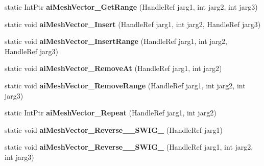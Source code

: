 \begin{DoxyCompactItemize}
\item 
\hypertarget{class_assimp_p_i_n_v_o_k_e_a067402d33404e75b24a23ec0c589fda9}{static Int\+Ptr {\bfseries ai\+Mesh\+Vector\+\_\+\+Get\+Range} (Handle\+Ref jarg1, int jarg2, int jarg3)}\label{class_assimp_p_i_n_v_o_k_e_a067402d33404e75b24a23ec0c589fda9}

\item 
\hypertarget{class_assimp_p_i_n_v_o_k_e_aa77d6f7cc1f1ae49b1a72f129b6dea1b}{static void {\bfseries ai\+Mesh\+Vector\+\_\+\+Insert} (Handle\+Ref jarg1, int jarg2, Handle\+Ref jarg3)}\label{class_assimp_p_i_n_v_o_k_e_aa77d6f7cc1f1ae49b1a72f129b6dea1b}

\item 
\hypertarget{class_assimp_p_i_n_v_o_k_e_a1399277a9d57d410a196fa8dad64eba4}{static void {\bfseries ai\+Mesh\+Vector\+\_\+\+Insert\+Range} (Handle\+Ref jarg1, int jarg2, Handle\+Ref jarg3)}\label{class_assimp_p_i_n_v_o_k_e_a1399277a9d57d410a196fa8dad64eba4}

\item 
\hypertarget{class_assimp_p_i_n_v_o_k_e_a43d3c23ec93759e18b2d0920986567df}{static void {\bfseries ai\+Mesh\+Vector\+\_\+\+Remove\+At} (Handle\+Ref jarg1, int jarg2)}\label{class_assimp_p_i_n_v_o_k_e_a43d3c23ec93759e18b2d0920986567df}

\item 
\hypertarget{class_assimp_p_i_n_v_o_k_e_a8bce49a751904101e55d2cc1dfda04bd}{static void {\bfseries ai\+Mesh\+Vector\+\_\+\+Remove\+Range} (Handle\+Ref jarg1, int jarg2, int jarg3)}\label{class_assimp_p_i_n_v_o_k_e_a8bce49a751904101e55d2cc1dfda04bd}

\item 
\hypertarget{class_assimp_p_i_n_v_o_k_e_a2faa3310281e171e500c1bdd4c5cc404}{static Int\+Ptr {\bfseries ai\+Mesh\+Vector\+\_\+\+Repeat} (Handle\+Ref jarg1, int jarg2)}\label{class_assimp_p_i_n_v_o_k_e_a2faa3310281e171e500c1bdd4c5cc404}

\item 
\hypertarget{class_assimp_p_i_n_v_o_k_e_ae2b9bc7da7ac8d34ffcad890d8e6fbb9}{static void {\bfseries ai\+Mesh\+Vector\+\_\+\+Reverse\+\_\+\+\_\+\+S\+W\+I\+G\+\_} (Handle\+Ref jarg1)}\label{class_assimp_p_i_n_v_o_k_e_ae2b9bc7da7ac8d34ffcad890d8e6fbb9}

\item 
\hypertarget{class_assimp_p_i_n_v_o_k_e_a55431cd81e2f48b18c4be9bf3c549f3f}{static void {\bfseries ai\+Mesh\+Vector\+\_\+\+Reverse\+\_\+\+\_\+\+S\+W\+I\+G\+\_} (Handle\+Ref jarg1, int jarg2, int jarg3)}\label{class_assimp_p_i_n_v_o_k_e_a55431cd81e2f48b18c4be9bf3c549f3f}


\end{DoxyCompactItemize}
